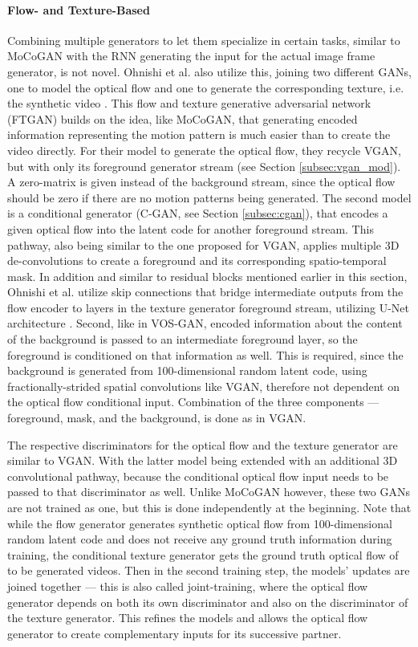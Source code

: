 \paragraph{Flow- and Texture-Based} 
Combining multiple generators to let them specialize in certain tasks, similar to MoCoGAN with the RNN generating the input for the actual image frame generator, is not novel. Ohnishi et al. also utilize this, joining two different GANs, one to model the optical flow and one to generate the corresponding texture, i.e. the synthetic video \cite{ohnishi2017hierarchical}. This flow and texture generative adversarial network (FTGAN) builds on the idea, like MoCoGAN, that generating encoded information representing the motion pattern is much easier than to create the video directly. For their model to generate the optical flow, they recycle VGAN, but with only its foreground generator stream (see Section \ref{subsec:vgan_mod}). A zero-matrix is given instead of the background stream, since the optical flow should be zero if there are no motion patterns being generated. The second model is a conditional generator (C-GAN, see Section \ref{subsec:cgan}), that encodes a given optical flow into the latent code for another foreground stream. This pathway, also being similar to the one proposed for VGAN, applies multiple 3D de-convolutions to create a foreground and its corresponding spatio-temporal mask. In addition and similar to residual blocks mentioned earlier in this section, Ohnishi et al. utilize skip connections that bridge intermediate outputs from the flow encoder to layers in the texture generator foreground stream, utilizing U-Net architecture \cite{ronneberger2015u}. Second, like in VOS-GAN, encoded information about the content of the background is passed to an intermediate foreground layer, so the foreground is conditioned on that information as well. This is required, since the background is generated from 100-dimensional random latent code, using fractionally-strided spatial convolutions like VGAN, therefore not dependent on the optical flow conditional input. Combination of the three components --- foreground, mask, and the background, is done as in VGAN. 

The respective discriminators for the optical flow and the texture generator are similar to VGAN. With the latter model being extended with an additional 3D convolutional pathway, because the conditional optical flow input needs to be passed to that discriminator as well. Unlike MoCoGAN however, these two GANs are not trained as one, but this is done independently at the beginning. Note that while the flow generator generates synthetic optical flow from 100-dimensional random latent code and does not receive any ground truth information during training, the conditional texture generator gets the ground truth optical flow of to be generated videos. Then in the second training step, the models' updates are joined together --- this is also called joint-training, where the optical flow generator depends on both its own discriminator and also on the discriminator of the texture generator. This refines the models and allows the optical flow generator to create complementary inputs for its successive partner. 

